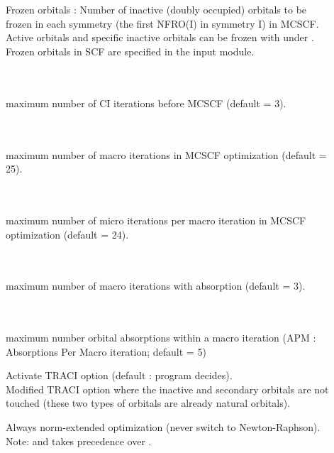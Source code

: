 \begin{description}
\item[] \ \\
   \\
  Frozen orbitals : Number of inactive (doubly occupied) orbitals to be frozen
  in each symmetry (the first NFRO(I) in symmetry I) in MCSCF.
  Active orbitals and specific inactive orbitals can be frozen with 
  under .
  Frozen orbitals in SCF are specified in the  input module.

\item[] \ \\
   \\
  maximum number of CI iterations before MCSCF (default = 3).

\item[] \ \\
   \\
  maximum number of macro iterations in MCSCF optimization (default = 25).

\item[] \ \\
   \\
  maximum number of micro iterations per macro iteration in MCSCF optimization
  (default = 24).

\item[] \ \\
   \\
  maximum number of macro iterations with 
  absorption (default = 3).

\item[] \ \\
   \\
  maximum number orbital absorptions within
  a macro iteration
  (APM : Absorptions Per Macro iteration; default = 5)

\item[]
  Activate TRACI option (default : program decides).\\
  Modified TRACI option where the inactive and secondary orbitals are not
  touched (these two types of orbitals are already natural orbitals).

\item[]
  Always norm-extended optimization (never switch to New\-ton-Raph\-son).
  Note:  and 
  takes precedence over .


\end{description}
